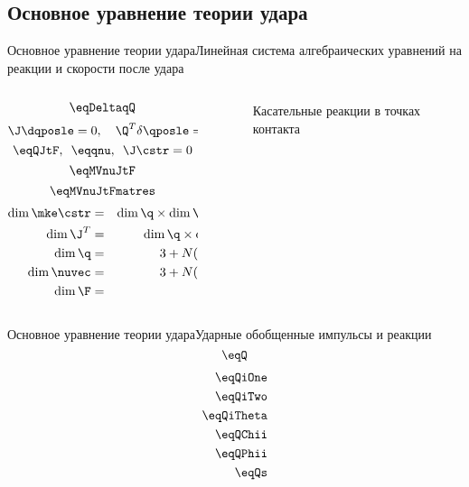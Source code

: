 \subsection{Основное уравнение теории удара}

\begin{frame}{Основное уравнение теории удара}{Линейная система алгебраических уравнений на реакции и скорости после удара}
    \begin{columns}
        \hspace{15pt}
        \begin{column}{0.35\textwidth}
            \vspace{-10pt}
            $$ \eqDeltaqQ $$
            $$ \J\dqposle = 0, \quad \Q^T\delta\qposle = 0 $$
            $$ \eqQJtF, \enspace \eqqnu, \enspace \J\cstr = 0 $$
            $$ \eqMVnuJtF $$
            $$ \eqMVnuJtFmatres $$
            \begin{eqnarray*}
                \dim \mke \cstr & = & \dim \q \times \dim \nuvec \\
                \dim \J^T & = & \dim \q \times \dim \F \\
                \dim \q & = & 3 + N(n + 1) \\
                \dim \nuvec & = & 3 + N(n - 1) \\
                \dim \F & = & 2N
            \end{eqnarray*}
        \end{column}
        \hspace{55pt}
        \begin{column}{0.65\textwidth}
            \begin{figure}
                \hspace{-55pt}
                \caption{Касательные реакции в точках контакта}
            \end{figure}
        \end{column}
    \end{columns}
\end{frame}

\begin{frame}{Основное уравнение теории удара}{Ударные обобщенные импульсы и реакции}
    \vspace{-5pt}
    $$ \eqQ $$
    \vspace{-15pt}
    \begin{eqnarray*}
    \eqQiOne \\
    \eqQiTwo \\
    \eqQiTheta \\
    \eqQChii \\
    \eqQPhii \\
    \eqQs
    \end{eqnarray*}
\end{frame}

